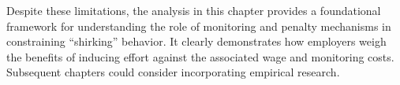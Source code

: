 Despite these limitations, the analysis in this chapter provides a foundational framework for understanding the role of monitoring and penalty mechanisms in constraining \enquote{shirking} behavior. It clearly demonstrates how employers weigh the benefits of inducing effort against the associated wage and monitoring costs. Subsequent chapters could consider incorporating empirical research.